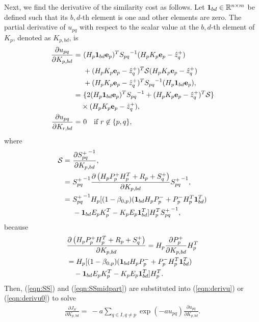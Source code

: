\documentclass[letterpaper, 10pt, conference]{ieeeconf}
\newcommand{\refeqn}[1]{(\ref{eqn:#1})}
\newcommand{\deriv}[2]{\ensuremath{\frac{\partial #1}{\partial #2}}}
\renewcommand{\Re}{\ensuremath{\mathbb{R}}}
\begin{document}
Next, we find the derivative of the similarity cost as follows.
Let $\Ibd\in \Re^{n\times m}$ be defined such that its $b,d$-th element is one and other elements are zero.
The partial derivative of $u_{pq}$ with respect to the scalar value at the $b,d$-th element of $K_p$, denoted as $K_{p,bd}$, is
\begin{align}
\deriv{u_{pq}}{K_{p,bd}}
=&\ 
(H_p\Ibd{\bf e}_p)^T
{S_{pq}}^{-1}
(H_pK_p{\bf e}_p-\hat z^+_{q})\nonumber
\\
&\ +
(H_pK_p{\bf e}_p-\hat z^+_{q})^T
\mathcal{S}
(H_pK_p{\bf e}_p-\hat z^+_{q})\nonumber
\\
&\ +
(H_pK_p{\bf e}_p-\hat z^+_{q})^T
{S_{pq}}^{-1}
(H_p\Ibd{\bf e}_p),\nonumber
\\
=&\ \{
2(H_p\Ibd{\bf e}_p)^T
{S_{pq}}^{-1} +(H_pK_p{\bf e}_p-\hat z^+_{q})^T
\mathcal{S}
\}\nonumber\\
&\times (H_pK_p{\bf e}_p-\hat z^+_{q}),\label{eqn:derivu}
\\
\deriv{u_{pq}}{K_{r,bd}}=&\ 0\quad \mbox{if } r\not\in\{p,q\},\label{eqn:derivu0}
\end{align}
where
\begin{align}
\mathcal{S}=&\ \deriv{{S^+_{pq}}^{-1}}{K_{p,bd}},\nonumber
\\
=&\ {S^+_{pq}}^{-1}
\deriv{\left(H_pP^+_{p}H_p^T+R_p+S^+_q\right)}{K_{p,bd}}
{S^+_{pq}}^{-1},\nonumber
\\
=&\ {S^+_{pq}}^{-1}
H_p
[(1-\beta_{0,p})(\Ibd H_pP_p^-+P_p^-H_p^T\Ibd^T)\nonumber
\\
&\ -\Ibd E_pK_p^T -K_pE_p\Ibd^T]
H_p^T
{S^+_{pq}}^{-1},\label{eqn:SS}
\end{align}
because
\begin{align}
&\deriv{\left(H_pP^+_{p}H_p^T+R_p+S^+_q\right)}{K_{p,bd}}
=
H_p
\deriv{P^+_{p}}{K_{p,bd}}
H_p^T\nonumber
\\
&=
H_p
[(1-\beta_{0,p})(\Ibd H_pP_p^-+P_p^-H_p^T\Ibd^T)\nonumber
\\
&\ \ \ -\Ibd E_pK_p^T -K_pE_p\Ibd^T]
H_p^T.\label{eqn:SSmidpart}
\end{align}
Then, \refeqn{SS} and \refeqn{SSmidpart} are substituted into \refeqn{derivu} or \refeqn{derivu0} to solve
\begin{align}
\label{eqn:JSK}
\deriv{J_S}{K_{p,bd}}=\ -a\sum\limits_{q\in I,q\neq p}\exp (-au_{pq})\deriv{u_{pq}}{K_{p,bd}}.
\end{align}
\end{document}
